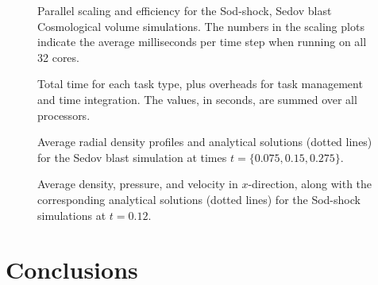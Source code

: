 \documentclass[a4paper,conference]{IEEEtran}
\begin{document}
\begin{figure*}
    \centerline{}
    \centerline{}
    \centerline{}
    
    \caption{Parallel scaling and efficiency for the Sod-shock, Sedov blast
        Cosmological volume simulations.
        The numbers in the scaling plots indicate the average milliseconds
        per time step when running on all 32 cores.}
    \label{fig:Results}
\end{figure*}


\begin{figure}
    \centerline{}
    
    \caption{Total time for each task type, plus overheads for task
        management and time integration.
        The values, in seconds, are summed over all processors.}
    \label{fig:Times}
\end{figure}


\begin{figure}
    \centerline{}
    
    \caption{Average radial density profiles and analytical solutions
        (dotted lines)
        for the Sedov blast simulation at
        times $t=\{0.075, 0.15, 0.275\}$.}
    \label{fig:Sedov_density}
\end{figure}

\begin{figure*}
    \centerline{}
    
    \caption{Average density, pressure, and velocity in $x$-direction,
        along with the corresponding analytical solutions (dotted lines)
        for the Sod-shock simulations at $t=0.12$.}
    \label{fig:SodShock_profiles}
\end{figure*}


\section{Conclusions}
\end{document}
